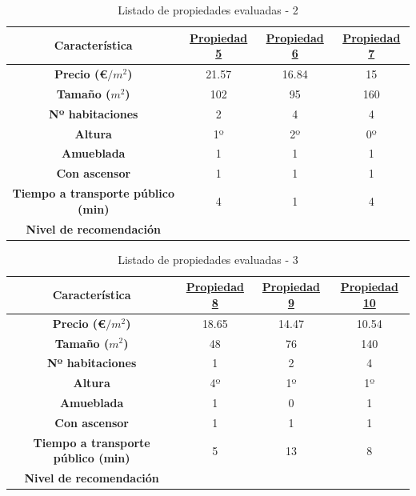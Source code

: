 \documentclass[12pt]{report} %
\begin{document}
    \begin{table}[h]
        \center
        \begin{tabular}{|c|ccc|}
            \hline
            \textbf{Característica} & \href{https://www.idealista.com/inmueble/106559777/}{Propiedad 5} & \href{https://www.idealista.com/inmueble/106224752/}{Propiedad 6} & \href{https://www.idealista.com/inmueble/106137531/}{Propiedad 7} \\
            \hline
            \hline
            \textbf{Precio (€$/m^2$)}                  & 21.57 & 16.84 & 15  \\
            \textbf{Tamaño ($m^2$)}                    & 102   & 95    & 160 \\
            \textbf{Nº habitaciones}                   & 2     & 4     & 4   \\
            \textbf{Altura}                            & 1º    & 2º    & 0º  \\
            \textbf{Amueblada\footnotemark[1]}         & 1     & 1     & 1   \\
            \textbf{Con ascensor\footnotemark[1]}      & 1     & 1     & 1   \\
            \textbf{Tiempo a transporte público (min)} & 4     & 1     & 4   \\
            \textbf{Nivel de recomendación}            &       &       &     \\
            \hline
        \end{tabular}
        \caption{Listado de propiedades evaluadas - 2}
    \end{table}
    \begin{table}[h]
        \center
        \begin{tabular}{|c|ccc|}
            \hline
            \textbf{Característica} & \href{https://www.idealista.com/inmueble/106330042/}{Propiedad 8} & \href{https://www.idealista.com/inmueble/106355273/}{Propiedad 9} & \href{https://www.idealista.com/inmueble/106107441/}{Propiedad 10} \\
            \hline
            \hline
            \textbf{Precio (€$/m^2$)}                  & 18.65 & 14.47 & 10.54 \\
            \textbf{Tamaño ($m^2$)}                    & 48    & 76    & 140   \\
            \textbf{Nº habitaciones}                   & 1     & 2     & 4     \\
            \textbf{Altura}                            & 4º    & 1º    & 1º    \\
            \textbf{Amueblada\footnotemark[1]}         & 1     & 0     & 1     \\
            \textbf{Con ascensor\footnotemark[1]}      & 1     & 1     & 1     \\
            \textbf{Tiempo a transporte público (min)} & 5     & 13    & 8     \\
            \textbf{Nivel de recomendación}            &       &       &       \\
            \hline
        \end{tabular}
        \caption{Listado de propiedades evaluadas - 3}
    \end{table}
\end{document}
